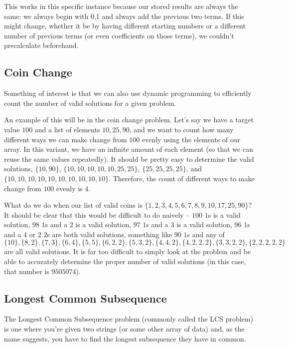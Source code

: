 This works in this specific instance because our stored results are always the same: we always begin with {0,1} and always add the previous two terms. If this might change, whether it be by having different starting numbers or a different number of previous terms (or even coefficients on those terms), we couldn't precalculate beforehand.

\subsection{Coin Change}

Something of interest is that we can also use dynamic programming to efficiently count the number of valid solutions for a given problem.

An example of this will be in the coin change problem. Let's say we have a target value $100$ and a list of elements $10,25,90$, and we want to count how many different ways we can make change from $100$ evenly using the elements of our array. In this variant, we have an infinite amount of each element (so that we can reuse the same values repeatedly). It should be pretty easy to determine the valid solutions, $\{10,90\}$, $\{10,10,10,10,10,25,25\}$, $\{25,25,25,25\}$, and $\{10,10,10,10,10,10,10,10,10,10\}$. Therefore, the count of different ways to make change from $100$ evenly is $4$.

What do we do when our list of valid coins is $\{1,2,3,4,5,6,7,8,9,10,17,25,90\}$? It should be clear that this would be difficult to do naively -- $100$ $1$s is a valid solution, $98$ $1$s and a $2$ is a valid solution, $97$ $1$s and a $3$ is a valid solution, $96$ $1$s and a $4$ or $2$ $2$s are both valid solutions, something like $90$ $1$s and any of $\{10\},\{8,2\},\{7,3\},\{6,4\},\{5,5\},\{6,2,2\},\{5,3,2\},\{4,4,2\},\{4,2,2,2\},\{3,3,2,2\},\{2,2,2,2,2\}$ are all valid solutions. It is far too difficult to simply look at the problem and be able to accurately determine the proper number of valid solutions (in this case, that number is $9505074$).


\subsection{Longest Common Subsequence}

The Longest Common Subsequence problem (commonly called the LCS problem) is one where you're given two strings (or some other array of data) and, as the name suggests, you have to find the longest subsequence they have in common.

